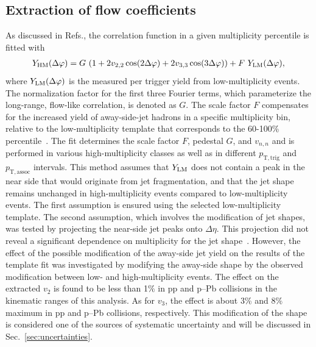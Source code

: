 \subsection{Extraction of flow coefficients}

As discussed in Refs.\cite{ATLAS:2015hzw,ATLAS:2016yzd}, the correlation function in a given multiplicity percentile is fitted with 
\begin{eqnarray}
\label{eq:narray}
Y_{\rm{HM}}(\Delta\varphi) = G~(1 + 2v_{2,2}\cos(2\Delta\varphi) + 2v_{3,3}\cos(3\Delta\varphi)) + F~Y_{\rm{LM}}(\Delta\varphi),
\end{eqnarray}
where $Y_{\rm{LM}}(\Delta\varphi)$ is the measured per trigger yield from low-multiplicity events. The normalization factor for the first three Fourier terms, which parameterize the long-range, flow-like correlation, is denoted as $G$. The scale factor $F$ compensates for the increased yield of away-side-jet hadrons in a specific multiplicity bin, relative to the low-multiplicity template that corresponds to the 60-100\% percentile~\cite{ALICE:2013tla,ALICE:2014mas}.
The fit determines the scale factor $F$, pedestal $G$, and $v_{n,n}$ and is performed in various high-multiplicity classes as well as in different $p_\mathrm{T,trig}$ and $p_\mathrm{T,assoc}$ intervals. 
This method assumes that $Y_{\rm{LM}}$ does not contain a peak in the near side that would originate from jet fragmentation, and that the jet shape remains unchanged in high-multiplicity events compared to low-multiplicity events. The first assumption is ensured using the selected low-multiplicity template. The second assumption, which involves the modification of jet shapes, was tested by projecting the near-side jet peaks onto $\Delta\eta$. This projection did not reveal a significant dependence on multiplicity for the jet shape~\cite{LAKOMOV2017329}. However, the effect of the possible modification of the away-side jet yield on the results of the template fit was investigated by modifying the away-side shape by the observed modification between low- and high-multiplicity events. The effect on the extracted $v_2$ is found to be less than 1$\%$ in pp and p--Pb collisions in the kinematic ranges of this analysis. As for $v_3$, the effect is about 3\% and 8$\%$ maximum in pp and p--Pb collisions, respectively.  This modification of the shape is considered one of the sources of systematic uncertainty and will be discussed in Sec.~\ref{sec:uncertainties}.

